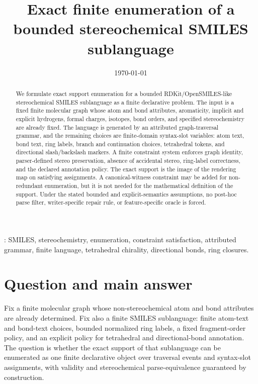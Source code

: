 \documentclass[10pt,a4paper]{article}
\title{Exact finite enumeration of a bounded stereochemical SMILES sublanguage}
\author{}
\date{\today}
\theoremstyle{definition}
\theoremstyle{remark}
\begin{document}
	\maketitle

	\begin{abstract}
		We formulate exact support enumeration for a bounded RDKit/OpenSMILES-like
		stereochemical SMILES sublanguage as a finite declarative problem.  The input is
		a fixed finite molecular graph whose atom and bond attributes, aromaticity,
		implicit and explicit hydrogens, formal charges, isotopes, bond orders, and
		specified stereochemistry are already fixed.  The language is generated by an
		attributed graph-traversal grammar, and the remaining choices are finite-domain
		syntax-slot variables: atom text, bond text, ring labels, branch and
		continuation choices, tetrahedral tokens, and directional slash/backslash
		markers.  A finite constraint system enforces graph identity, parser-defined
		stereo preservation, absence of accidental stereo, ring-label correctness, and
		the declared annotation policy.  The exact support is the image of the rendering
		map on satisfying assignments.  A canonical-witness constraint may be added for
		non-redundant enumeration, but it is not needed for the mathematical definition
		of the support.  Under the stated bounded and explicit-semantics assumptions, no
		post-hoc parse filter, writer-specific repair rule, or feature-specific oracle is
		forced.
	\end{abstract}

	: SMILES, stereochemistry, enumeration, constraint
	satisfaction, attributed grammar, finite language, tetrahedral chirality,
	directional bonds, ring closures.

	\section{Question and main answer}
	\label{s:intro}

	Fix a finite molecular graph whose non-stereochemical atom and bond attributes
	are already determined.  Fix also a finite SMILES sublanguage: finite atom-text
	and bond-text choices, bounded normalized ring labels, a fixed fragment-order
	policy, and an explicit policy for tetrahedral and directional-bond annotation.
	The question is whether the exact support of that sublanguage can be enumerated
	as one finite declarative object over traversal events and syntax-slot
	assignments, with validity and stereochemical parse-equivalence guaranteed by
	construction.
\end{document}
